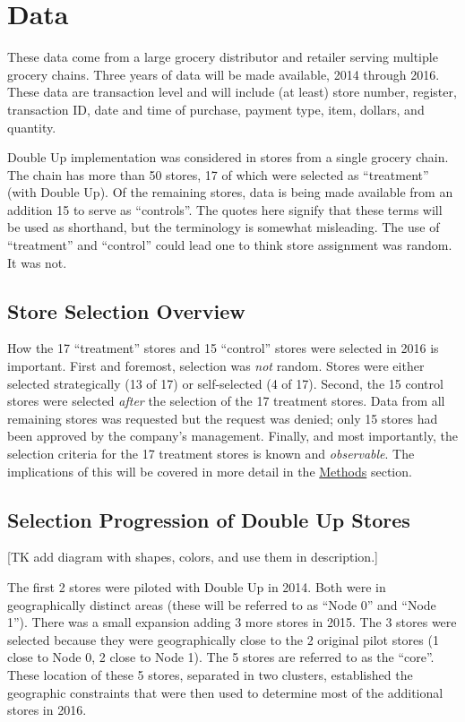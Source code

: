 \documentclass[11pt,letterpaperpaper,]{book}
\begin{document}
\section{Data}\label{data}

These data come from a large grocery distributor and retailer serving
multiple grocery chains. Three years of data will be made available,
2014 through 2016. These data are transaction level and will include (at
least) store number, register, transaction ID, date and time of
purchase, payment type, item, dollars, and quantity.

Double Up implementation was considered in stores from a single grocery
chain. The chain has more than 50 stores, 17 of which were selected as
``treatment'' (with Double Up). Of the remaining stores, data is being
made available from an addition 15 to serve as ``controls''. The quotes
here signify that these terms will be used as shorthand, but the
terminology is somewhat misleading. The use of ``treatment'' and
``control'' could lead one to think store assignment was random. It was
not.

\subsection{Store Selection Overview}\label{store-selection-overview}

How the 17 ``treatment'' stores and 15 ``control'' stores were selected
in 2016 is important. First and foremost, selection was \emph{not}
random. Stores were either selected strategically (13 of 17) or
self-selected (4 of 17). Second, the 15 control stores were selected
\emph{after} the selection of the 17 treatment stores. Data from all
remaining stores was requested but the request was denied; only 15
stores had been approved by the company's management. Finally, and most
importantly, the selection criteria for the 17 treatment stores is known
and \emph{observable}. The implications of this will be covered in more
detail in the \protect\hyperlink{methods}{Methods} section.

\subsection{Selection Progression of Double Up
Stores}\label{selection-progression-of-double-up-stores}

{[}TK add diagram with shapes, colors, and use them in description.{]}

The first 2 stores were piloted with Double Up in 2014. Both were in
geographically distinct areas (these will be referred to as ``Node 0''
and ``Node 1''). There was a small expansion adding 3 more stores in
2015. The 3 stores were selected because they were geographically close
to the 2 original pilot stores (1 close to Node 0, 2 close to Node 1).
The 5 stores are referred to as the ``core''. These location of these 5
stores, separated in two clusters, established the geographic
constraints that were then used to determine most of the additional
stores in 2016.
\end{document}

